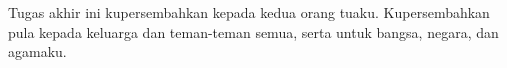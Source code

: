 \vspace{7cm}

\begin{center}
	Tugas akhir ini kupersembahkan kepada kedua orang tuaku. Kupersembahkan pula kepada keluarga dan teman-teman semua, serta untuk bangsa, negara, dan agamaku.
\end{center}

